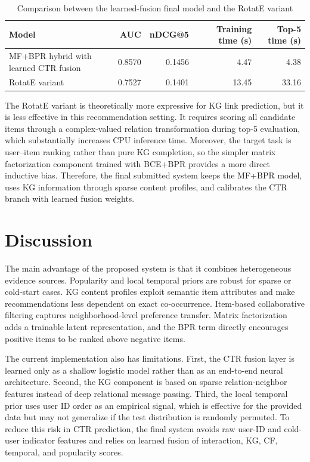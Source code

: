 \documentclass[onecolumn,a4paper,12pt]{IEEEtran}
\begin{document}
\begin{table}[h]
\centering
\caption{Comparison between the learned-fusion final model and the RotatE variant}
\begin{tabular}{lrrrr}
\toprule
Model & AUC & nDCG@5 & Training time (s) & Top-5 time (s) \\
\midrule
MF+BPR hybrid with learned CTR fusion & 0.8570 & 0.1456 & 4.47 & 4.38 \\
RotatE variant & 0.7527 & 0.1401 & 13.45 & 33.16 \\
\bottomrule
\end{tabular}
\end{table}

The RotatE variant is theoretically more expressive for KG link prediction, but it is less effective in this recommendation setting. It requires scoring all candidate items through a complex-valued relation transformation during top-5 evaluation, which substantially increases CPU inference time. Moreover, the target task is user--item ranking rather than pure KG completion, so the simpler matrix factorization component trained with BCE+BPR provides a more direct inductive bias. Therefore, the final submitted system keeps the MF+BPR model, uses KG information through sparse content profiles, and calibrates the CTR branch with learned fusion weights.

\section{Discussion}

The main advantage of the proposed system is that it combines heterogeneous evidence sources. Popularity and local temporal priors are robust for sparse or cold-start cases. KG content profiles exploit semantic item attributes and make recommendations less dependent on exact co-occurrence. Item-based collaborative filtering captures neighborhood-level preference transfer. Matrix factorization adds a trainable latent representation, and the BPR term directly encourages positive items to be ranked above negative items.

The current implementation also has limitations. First, the CTR fusion layer is learned only as a shallow logistic model rather than as an end-to-end neural architecture. Second, the KG component is based on sparse relation-neighbor features instead of deep relational message passing. Third, the local temporal prior uses user ID order as an empirical signal, which is effective for the provided data but may not generalize if the test distribution is randomly permuted. To reduce this risk in CTR prediction, the final system avoids raw user-ID and cold-user indicator features and relies on learned fusion of interaction, KG, CF, temporal, and popularity scores.
\end{document}
